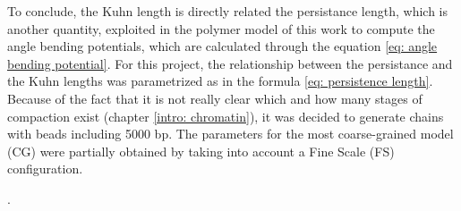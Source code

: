 To conclude, the Kuhn length is directly related the persistance length, which is another quantity, exploited in the polymer model of this work to compute the angle bending potentials, which are calculated through the equation \ref{eq: angle bending potential}. For this project, the relationship between the persistance and the Kuhn lengths was parametrized as in the formula \ref{eq: persistence length}.\\

Because of the fact that it is not really clear which and how many stages of compaction exist (chapter \ref{intro: chromatin}), it was decided to generate chains with beads including 5000 bp. The parameters for the most coarse-grained model (CG) were partially obtained by taking into account a Fine Scale (FS) configuration.





.

